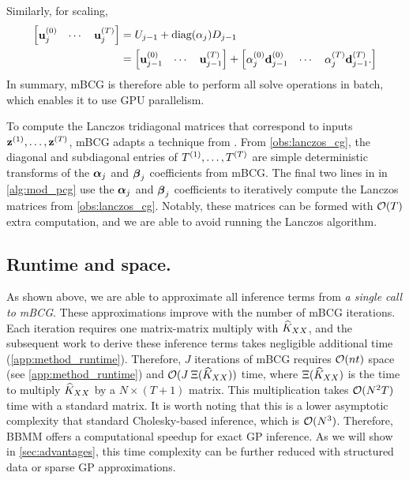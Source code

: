 %
Similarly, for scaling,
%
\begin{align*}
  \begin{bmatrix}
    \mathbf{u}_j^{(0)} & \cdots & \mathbf{u}_j^{(T)}
  \end{bmatrix}
  &=
  U_{j-1} + \text{diag}(\alpha_j) D_{j-1}
  \\
  &=
  \begin{bmatrix}
    \mathbf{u}_{j-1}^{(0)} & \cdots & \mathbf{u}_{j-1}^{(T)}
  \end{bmatrix}
  +
  \begin{bmatrix}
    \alpha_{j}^{(0)} \mathbf{d}_{j-1}^{(0)} & \cdots &  \alpha_{j}^{(T)} \mathbf{d}_{j-1}^{(T)}.
  \end{bmatrix}
\end{align*}
%
In summary, mBCG is therefore able to perform all solve operations in batch, which enables it to use GPU parallelism.

To compute the Lanczos tridiagonal matrices  that correspond to inputs $\mathbf{z}^{(1)}, \ldots, \mathbf{z}^{(T)}$, mBCG adapts a technique from \citet{saad2003iterative}.
From \cref{obs:lanczos_cg}, the diagonal and subdiagonal entries of $T^{(1)}, \ldots, T^{(T)}$ are simple deterministic transforms of the $\boldsymbol{\alpha}_j$ and $\boldsymbol{\beta}_j$ coefficients from mBCG.
The final two lines in {\color{\colornew} } in \cref{alg:mod_pcg} use the $\boldsymbol{\alpha}_j$ and $\boldsymbol{\beta}_j$ coefficients to iteratively compute the Lanczos matrices from \cref{obs:lanczos_cg}.
Notably, these matrices can be formed with $\bigo{T}$ extra computation, and we are able to avoid running the Lanczos algorithm.




\subsection{Runtime and space.}
As shown above, we are able to approximate all inference terms from \emph{a single call to mBCG}.
These approximations improve with the number of mBCG iterations.
Each iteration requires one matrix-matrix multiply with $\widehat{K}_{XX}$, and the subsequent work to derive these inference terms takes negligible additional time (\cref{app:method_runtime}).
Therefore, $J$ iterations of mBCG requires $\bigo{nt}$ space (see \cref{app:method_runtime}) and $\bigo{J \: \mmm{\trainK}}$ time,
where $\Xi (\widehat{K}_{XX})$ is the time to multiply $\widehat{K}_{XX}$ by a $N \times (T + 1)$ matrix.
This multiplication takes $\bigo{N^2 T}$ time with a standard matrix.
It is worth noting that this is a lower asymptotic complexity that standard Cholesky-based inference, which is $\bigo{N^3}$.
Therefore, BBMM offers a computational speedup for exact GP inference.
As we will show in \cref{sec:advantages}, this time complexity can be further reduced with structured data or sparse GP approximations.

